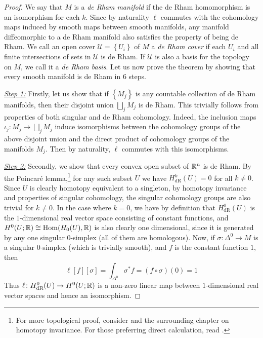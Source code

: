 \documentclass[a4paper, 12pt]{article}
\begin{document}
\begin{proof}
    We say that $M$ is a \emph{de Rham manifold} if the de Rham homomorphism is
    an isomorphism for each $k$.  Since by naturality $\ell$ commutes with the
    cohomology maps induced by smooth maps between smooth manifolds, any
    manifold diffeomorphic to a de Rham manifold also satisfies the property of
    being de Rham.  We call an open cover $\mathcal{U} = \left\{ U_i \right\}$
    of $M$ a \emph{de Rham cover} if each $U_i$ and all finite intersections of
    sets in $\mathcal{U}$ is de Rham. If $\mathcal{U}$ is also a basis for the
    topology on $M$, we call it a \emph{de Rham basis}.
    Let us now prove the theorem by showing that every smooth manifold is de
    Rham in $6$ steps.

    \underline{\emph{Step 1:}}
    Firstly, let us show that if $\left\{ M_j \right\}$ is any countable
    collection of de Rham manifolds, then their disjoint union $\bigsqcup_j
    M_j$ is de Rham.
    This trivially follows from properties of both singular and de Rham cohomology.
    Indeed, the inclusion maps $\iota_j \colon M_j \to \bigsqcup_j M_j$ induce
    isomorphisms between the cohomology groups of the above disjoint union and
    the direct product of cohomology groups of the manifolds $M_j$. Then by
    naturality, $\ell$ commutes with this isomorphisms.

    \underline{\emph{Step 2:}}
    Secondly, we show that every convex open subset of $\mathbb{R}^n$ is de Rham.  By
    the Poincar\'e lemma,\footnote{For more topological proof, consider
    \cite[Thm. 17.14]{Lee2012} and the surrounding chapter on homotopy
    invariance. For those preferring direct calculation, read
    \cite[4.18]{Warner1983}.} for any such subset $U$ we have $H_{\text{dR}}^k(U) = 0$ for all $k \neq 0$.
    Since $U$ is clearly homotopy equivalent to a singleton,
    by homotopy invariance and properties of singular cohomology,
    the singular cohomology groups are also trivial for $k \neq 0$.
    In the case where $k = 0$, we have by definition that $H_{\text{dR}}^0(U)$ is the $1$-dimensional real vector space consisting of constant functions,
    and $H^0(U ; \mathbb{R}) \cong \operatorname{Hom}(H_0(U), \mathbb{R})$ is also clearly one dimensional, since it is generated by any one singular $0$-simplex (all of them are homologous).
    Now, if $\sigma \colon \Delta^0 \to M$ is a singular $0$-simplex (which is trivially smooth),
    and $f$ is the constant function $1$,
    then
    \[
        \ell[f][\sigma]
        = \int_{\Delta^0} \sigma^*f
        = (f \circ \sigma)(0)
        = 1
    \]
    Thus $\ell \colon H_{\text{dR}}^0(U) \to H^0(U; \mathbb{R})$ is a non-zero linear
    map between $1$-dimensional real vector spaces and hence an isomorphism.


\end{proof}
\end{document}
